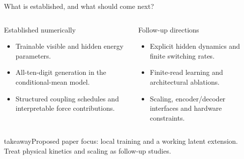 \documentclass[aspectratio=169,10pt]{beamer}
\newcommand{\takeaway}[1]{\begin{beamercolorbox}[sep=.16cm,wd=\textwidth]{takeaway}\small #1\end{beamercolorbox}}
\begin{document}
\begin{frame}{What is established, and what should come next?}
  \begin{columns}[t,onlytextwidth]
      \begin{block}{Established numerically}
        \begin{itemize}\setlength\itemsep{.25cm}
          \item Trainable visible and hidden energy parameters.
          \item All-ten-digit generation in the conditional-mean model.
          \item Structured coupling schedules and interpretable force contributions.
        \end{itemize}
      \end{block}
      \begin{block}{Follow-up directions}
        \begin{itemize}\setlength\itemsep{.25cm}
          \item Explicit hidden dynamics and finite switching rates.
          \item Finite-read learning and architectural ablations.
          \item Scaling, encoder/decoder interfaces and hardware constraints.
        \end{itemize}
      \end{block}
  \end{columns}
  \vspace{.35cm}\takeaway{Proposed paper focus: local training and a working latent extension. Treat physical kinetics and scaling as follow-up studies.}
\end{frame}
\end{document}
